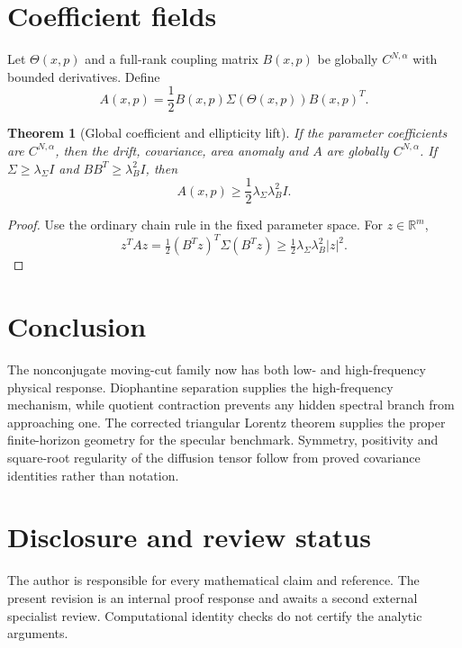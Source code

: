 \documentclass[11pt,reqno]{amsart}
\newtheorem{theorem}{Theorem}[section]
\theoremstyle{definition}
\theoremstyle{remark}
\newcommand{\R}{\mathbb R}
\newcommand{\abs}[1]{\left\lvert #1\right\rvert}
\begin{document}
\section{Coefficient fields}\label{sec:fields}

Let $\Theta(x,p)$ and a full-rank coupling matrix $B(x,p)$ be globally
$C^{N,\alpha}$ with bounded derivatives.  Define
\[
 A(x,p)=\frac12B(x,p)\Sigma(\Theta(x,p))B(x,p)^T.
\]

\begin{theorem}[Global coefficient and ellipticity lift]\label{thm:lift}
If the parameter coefficients are $C^{N,\alpha}$, then the drift, covariance,
area anomaly and $A$ are globally $C^{N,\alpha}$.  If
$\Sigma\ge\lambda_\Sigma I$ and
$BB^T\ge\lambda_B^2I$, then
\[
 A(x,p)\ge\frac12\lambda_\Sigma\lambda_B^2I.
\]
\end{theorem}

\begin{proof}
Use the ordinary chain rule in the fixed parameter space.  For $z\in\R^m$,
\[
 z^TAz=\tfrac12(B^Tz)^T\Sigma(B^Tz)
 \ge\tfrac12\lambda_\Sigma\lambda_B^2\abs z^2.
\]
\end{proof}

\section{Conclusion}

The nonconjugate moving-cut family now has both low- and high-frequency
physical response.  Diophantine separation supplies the high-frequency
mechanism, while quotient contraction prevents any hidden spectral branch
from approaching one.  The corrected triangular Lorentz theorem supplies the
proper finite-horizon geometry for the specular benchmark.  Symmetry,
positivity and square-root regularity of the diffusion tensor follow from
proved covariance identities rather than notation.

\section*{Disclosure and review status}
The author is responsible for every mathematical claim and reference.  The
present revision is an internal proof response and awaits a second external
specialist review.  Computational identity checks do not certify the analytic
arguments.



\end{document}
